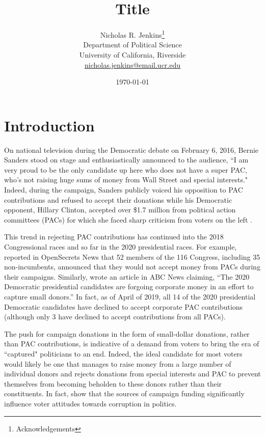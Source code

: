 \documentclass[12pt]{article}
\title{\textbf{Title}}
\author{Nicholas R. Jenkins\thanks{Acknowledgements} \\ Department of Political Science\\ University of California, Riverside\\ \href{mailto:nicholas.jenkins@email.ucr.edu}{nicholas.jenkins@email.ucr.edu}}
\date{\today}
\begin{document}
\maketitle
\thispagestyle{empty}

\pagebreak

\cleardoublepage
\setcounter{page}{1}

\doublespacing

\section{Introduction} \label{sec: intro}

On national television during the Democratic debate on February 6, 2016, Bernie Sanders stood on stage and enthusiastically announced to the audience, ``I am very proud to be the only candidate up here who does not have a super PAC, who’s not raising huge sums of money from Wall Street and special interests." Indeed, during the campaign, Sanders publicly voiced his opposition to PAC contributions and refused to accept their donations while his Democratic opponent, Hillary Clinton, accepted over \$1.7 million from political action committees (PACs) for which she faced sharp criticism from voters on the left \citep{harper2019, yeheelee2016, seitz-wald2015, bump2016}. 

This trend in rejecting PAC contributions has continued into the 2018 Congressional races and so far in the 2020 presidential races. For example, \citet{evers-hillstrom2018} reported in OpenSecrets News that 52 members of the 116 Congress, including 35 non-incumbents, announced that they would not accept money from PACs during their campaigns. Similarly,  wrote an article in ABC News claiming, ``The 2020 Democratic presidential candidates are forgoing corporate money in an effort to capture small donors.'' In fact, as of April of 2019, all 14 of the 2020 presidential Democratic candidates have declined to accept corporate PAC contributions (although only 3 have declined to accept contributions from all PACs). 

The push for campaign donations in the form of small-dollar donations, rather than PAC contributions, is indicative of a demand from voters to bring the era of ``captured" politicians to an end. Indeed, the ideal candidate for most voters would likely be one that manages to raise money from a large number of individual donors and rejects donations from special interests and PAC to prevent themselves from becoming beholden to these donors rather than their constituents. In fact, \citet{bowler2016} show that the sources of campaign funding significantly influence voter attitudes towards corruption in politics.  
\end{document}
